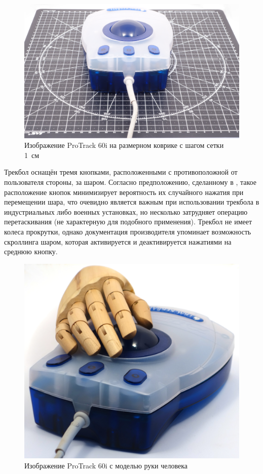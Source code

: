 \documentclass[11pt, a4paper]{article}
\begin{document}
\begin{figure}[h]
    \centering
    \includegraphics[scale=0.3]{1999_protrack_60i/monstr2.jpg}
    \caption{Изображение ProTrack 60i на размерном коврике с шагом сетки 1~см}
    \label{fig:ProTrack60iSize}
\end{figure}

Трекбол оснащён тремя кнопками, расположенными с противоположной от пользователя стороны, за шаром.
Согласно предположению, сделанному в \cite{trackballfan}, такое расположение кнопок минимизирует вероятность их случайного нажатия при перемещении шара, что очевидно является важным при использовании трекбола в индустриальных либо военных установках, но несколько затрудняет операцию перетаскивания (не характерную для подобного применения).
Трекбол не имеет колеса прокрутки, однако документация производителя упоминает возможность скроллинга шаром, которая активируется и деактивируется нажатиями на среднюю кнопку.

\begin{figure}[h]
    \centering
    \includegraphics[scale=0.3]{1999_protrack_60i/raz_monstr_60.jpg}
    \caption{Изображение ProTrack 60i с моделью руки человека}
    \label{fig:ProTrack60iHand}
\end{figure}
\end{document}
